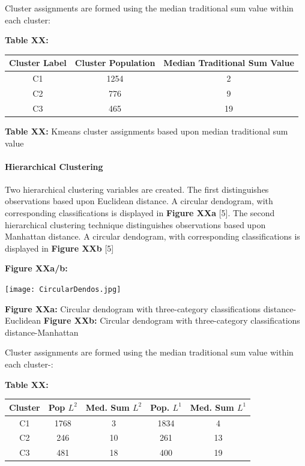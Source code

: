 \documentclass[12pt,]{article}
\let\oldparagraph\paragraph
\renewcommand{\paragraph}[1]{\oldparagraph{#1}\mbox{}}
\begin{document}
Cluster assignments are formed using the median traditional sum value
within each cluster:

\textbf{Table XX:}

\begin{center}
\begin{tabular}{|c|c|c|}
\hline
Cluster Label & Cluster Population & Median Traditional Sum Value \\
\hline
\hline
C1 & 1254 & 2 \\
\hline
C2 & 776 & 9 \\
\hline
C3 & 465 & 19 \\
\hline
\end{tabular}
\end{center}

\textbf{Table XX:} Kmeans cluster assignments based upon median
traditional sum value

\hypertarget{hierarchical-clustering}{%
\paragraph{Hierarchical Clustering}\label{hierarchical-clustering}}

Two hierarchical clustering variables are created. The first
distinguishes observations based upon Euclidean distance. A circular
dendogram, with corresponding classifications is displayed in
\textbf{Figure XXa} {[}5{]}. The second hierarchical clustering
technique distinguishes observations based upon Manhattan distance. A
circular dendogram, with corresponding classifications is displayed in
\textbf{Figure XXb} {[}5{]}

\textbf{Figure XXa/b:}

\begin{center}
\texttt{[image: CircularDendos.jpg]}
\end{center}

\textbf{Figure XXa:} Circular dendogram with three-category
classifications distance-Euclidean \textbf{Figure XXb:} Circular
dendogram with three-category classifications distance-Manhattan

Cluster assignments are formed using the median traditional sum value
within each cluster-:

\textbf{Table XX:}

\begin{center}
\begin{tabular}{|c|c|c|c|c|}
\hline
Cluster &  Pop $L^{2}$ & Med. Sum  $L^{2}$ & Pop. $L^{1}$ & Med. Sum $L^{1}$\\
\hline
\hline
C1 & 1768 & 3 & 1834 & 4\\
\hline
C2 & 246 & 10 & 261 & 13 \\
\hline
C3 & 481 & 18 & 400 & 19 \\
\hline
\end{tabular}
\end{center}
\end{document}
